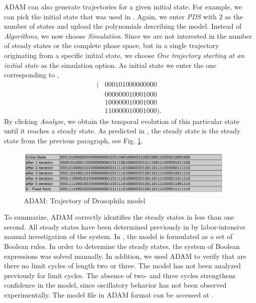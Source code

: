 \documentclass[10pt]{bmc_article}
\begin{document}
ADAM can also generate trajectories for a given initial state. For example, we
can pick the initial state that was used in \cite[Figure 4(a)]{AO}. Again, we
enter {\it PDS} with $2$ as the number of states and upload the polynomials
describing the model. Instead of {\it Algorithms}, we now choose {\it
Simulation}. Since we are not interested in the number of steady states or the
complete phase space, but in a single trajectory originating from a specific
initial state,  we choose {\it One trajectory starting at an initial state} as the simulation option. As
initial state we enter the one corresponding to \cite[Figure 4(a)]{AO},
\begin{align*}
(&0 0 0 1 0 1 0 0 0 0 0 0 0 0 0\\
&0 0 0 0 0 0 0 1 0 0 0 1 0 0 0\\
&1 0 0 0 0 0 0 1 0 0 0 1 0 0 0\\
&1 1 0 0 0 0 0 1 0 0 0 1 0 0 0).
\end{align*}
By clicking {\it Analyze}, we obtain the temporal evolution of this particular
state until it reaches a steady state. As predicted in \cite{AO}, the
steady state is the steady state from the previous paragraph, see Fig.
\ref{fig:traj}.
\begin{figure}[htb]
\centering
\includegraphics[width=0.95\textwidth]{DroTraj.jpg}
\caption{ADAM: Trajectory of Drosophila model}
\label{fig:traj}
\end{figure}
To summarize, ADAM correctly identifies the steady states
in less than one second. All steady states have been determined previously in \cite{AO} by labor-intensive manual investigation of the system. In \cite{AO}, the model is formulated as a set of Boolean rules. In order to determine the steady states, the system of Boolean expressions was solved manually.
In addition, we used ADAM to verify that are there no limit
cycles of length two or three. The model has not been analyzed previously for
limit cycles. The absence of two- and three cycles strengthens confidence in
the model, since oscillatory behavior has not been observed experimentally.
The model file in ADAM format can be accessed at \cite{DrosophilaModel}.
\end{document}
